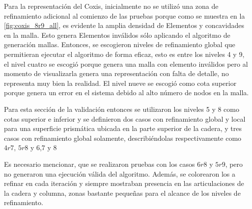 Para la representación del Coxis, inicialmente no se utilizó una zona de refinamiento adicional al comienzo de las pruebas porque como se muestra en la \autoref{fig:coxis_8r9_all}, es evidente la amplia densidad de Elementos y concavidades en la malla. Esto genera Elementos inválidos sólo aplicando el algoritmo de generación mallas. Entonces, se escogieron niveles de refinamiento global que permitieran ejecutar el algoritmo de forma eficaz, esto es entre los niveles 4 y 9, el nivel cuatro se escogió porque genera una malla con elemento inválidos pero al momento de visualizarla genera una representación con falta de detalle, no representa muy bien la realidad. El nivel nueve se escogió como cota superior porque genera un error en el sistema debido al alto número de nodos en la malla.

Para esta sección de la validación entonces se utilizaron los niveles 5 y 8 como cotas superior e inferior y se definieron dos casos con refinamiento global y local para una superficie prismática ubicada en la parte superior de la cadera, y tres casos con refinamiento global solamente, describiéndolas respectivamente como $4r7$, $5r8$ y $6$,$7$ y $8$



Es necesario mencionar, que se realizaron pruebas con los casos $6r8$ y $5r9$, pero no generaron una ejecución válida del algoritmo.
Además, se colorearon los \octants{} a refinar en cada iteración y siempre mostraban presencia en las articulaciones de la cadera y columna, zonas bastante pequeñas para el alcance de los niveles de refinamiento.


